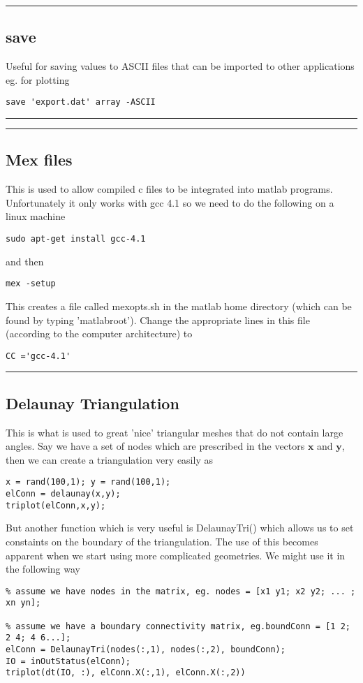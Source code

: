 \documentclass[a4paper, 10pt]{article}
\newcommand{\mytoprule}{\hrule\vspace{4mm}}
\newcommand{\mybotrule}{\vspace{4mm}\hrule}
\begin{document}
\mytoprule
\subsection*{save}
Useful for saving values to ASCII files that can be imported to other applications eg. for plotting
\begin{Verbatim}[commandchars=\\\{\}]
save 'export.dat' array -ASCII
\end{Verbatim}
\mybotrule


\mytoprule
\subsection*{Mex files}
This is used to allow compiled c files to be integrated into matlab programs. Unfortunately it only works with gcc 4.1 so we need to do the following on a linux machine
\begin{Verbatim}
sudo apt-get install gcc-4.1
\end{Verbatim}
and then 
\begin{Verbatim}
mex -setup
\end{Verbatim}
This creates a file called mexopts.sh in the matlab home directory (which can be found by typing 'matlabroot'). Change the appropriate lines in this file (according to the computer architecture) to 
\begin{Verbatim}
CC ='gcc-4.1'
\end{Verbatim}
\mybotrule

\subsection*{Delaunay Triangulation}
This is what is used to great 'nice' triangular meshes that do not contain large angles. Say we have a set of nodes which are prescribed in the vectors $\mathbf{x}$ and $\mathbf{y}$, then we can create a triangulation very easily as
\begin{verbatim}
x = rand(100,1); y = rand(100,1);
elConn = delaunay(x,y);
triplot(elConn,x,y);
\end{verbatim}

But another function which is very useful is DelaunayTri() which allows us to set constaints on the boundary of the triangulation. The use of this becomes apparent when we start using more complicated geometries. We might use it in the following way
\begin{verbatim}
% assume we have nodes in the matrix, eg. nodes = [x1 y1; x2 y2; ... ; xn yn];

% assume we have a boundary connectivity matrix, eg.boundConn = [1 2; 2 4; 4 6...];
elConn = DelaunayTri(nodes(:,1), nodes(:,2), boundConn);
IO = inOutStatus(elConn);
triplot(dt(IO, :), elConn.X(:,1), elConn.X(:,2))
\end{verbatim}
\end{document}
